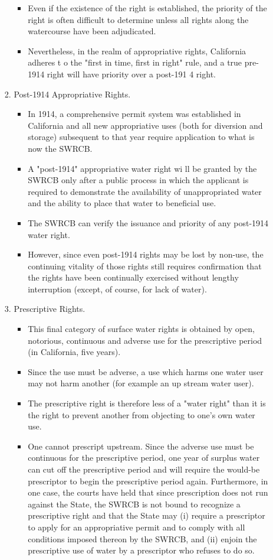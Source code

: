 \documentclass{article}
\begin{document}
\begin{enumerate}
\begin{itemize}
\begin{enumerate}
\begin{itemize}
\item Even if the existence of the right is established, the priority of the right is often difficult to determine unless all rights along the watercourse have been adjudicated. 
\item Nevertheless, in the realm of appropriative rights, California adheres t o the "first in time, first in right" rule, and a true pre-1914 right will have priority over a post-191 4 right. 
\end{itemize}
\item Post-1914 Appropriative Rights. 
\begin{itemize} 
\item In 1914, a comprehensive permit system was established in California and all new appropriative uses (both for diversion and storage) subsequent to that year require application to what is now the SWRCB.
\item A "post-1914" appropriative water right wi ll be granted by the SWRCB only after a public process in which the applicant is required to demonstrate the availability of unappropriated water and the ability to place that water to beneficial use. 
\item The SWRCB can verify the issuance and priority of any post-1914 water right. 
\item However, since even post-1914 rights may be lost by non-use, the continuing vitality of those rights still requires confirmation that the rights have been continually exercised without lengthy interruption (except, of course, for lack of water).
\end{itemize} 
\item Prescriptive Rights. 
\begin{itemize}
\item This final category of surface water rights is obtained by open, notorious, continuous and adverse use for the prescriptive period (in California, five years). 
\item Since the use must be adverse, a use which harms one water user may not harm another (for example an up stream water user). 
\item The prescriptive right is therefore less of a "water right" than it is the right to prevent another from objecting to one's own water use. 
\item One cannot prescript upstream. Since the adverse use must be continuous for the prescriptive period, one year of surplus water can cut off the prescriptive period and will require the would-be prescriptor to begin the prescriptive period again. Furthermore, in one case, the courts have held that since prescription does not run against the State, the SWRCB is not bound to recognize a prescriptive right and that the State may (i) require a prescriptor to apply for an appropriative permit and to comply with all conditions imposed thereon by the SWRCB, and (ii) enjoin the prescriptive use of water by a prescriptor who refuses to do so.

\end{itemize}
\end{enumerate}
\end{itemize}
\end{enumerate}
\end{document}
